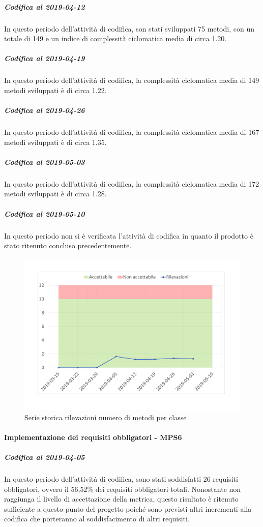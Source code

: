 \subparagraph{Codifica al 2019-04-12}
In questo periodo dell'attività di codifica, son stati sviluppati 75 metodi, con un totale di 149 e un indice di complessità ciclomatica media di circa 1.20.

\subparagraph{Codifica al 2019-04-19}
In questo periodo dell'attività di codifica, la complessità ciclomatica media di 149 metodi sviluppati è di circa 1.22. 

\subparagraph{Codifica al 2019-04-26}
In questo periodo dell'attività di codifica, la complessità ciclomatica media di 167 metodi sviluppati è di circa 1.35. 

\subparagraph{Codifica al 2019-05-03}
In questo periodo dell'attività di codifica, la complessità ciclomatica media di 172 metodi sviluppati è di circa 1.28. 

\subparagraph{Codifica al 2019-05-10}
In questo periodo non si è verificata l'attività di codifica in quanto il prodotto è stato ritenuto concluso precedentemente.

\begin{figure}[H]
	\centering
	\includegraphics[scale=0.6]{images/resoconto/MPS5Chart.pdf}
	\caption{Serie storica rilevazioni numero di metodi per classe}	
\end{figure}


\paragraph{Implementazione dei requisiti obbligatori - MPS6}
\subparagraph{Codifica al 2019-04-05}
In questo periodo dell'attività di codifica, sono stati soddisfatti 26 requisiti obbligatori, ovvero il 56,52\% dei requisiti obbligatori totali.
Nonostante non raggiunga il livello di accettazione della
metrica, questo risultato è ritenuto sufficiente a questo punto del progetto poiché sono previsti altri incrementi alla codifica che porteranno al soddisfacimento di altri requisiti.

